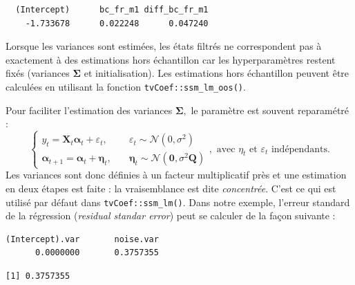 \documentclass[
  a4paper,
  DIV=11,
  numbers=noendperiod,
  french]{scrartcl}
\newenvironment{Shaded}{\begin{snugshade}}{\end{snugshade}}
\newcommand{\FunctionTok}[1]{\textcolor[rgb]{0.28,0.35,0.67}{#1}}
\newcommand{\NormalTok}[1]{\textcolor[rgb]{0.00,0.23,0.31}{#1}}
\newcommand{\SpecialCharTok}[1]{\textcolor[rgb]{0.37,0.37,0.37}{#1}}
\newcommand\1{{\mathds 1}}
\newcommand{\bf}[1]{{\boldsymbol #1}}
\theoremstyle{remark}
\begin{document}
\begin{verbatim}
  (Intercept)      bc_fr_m1 diff_bc_fr_m1 
    -1.733678      0.022248      0.047240 
\end{verbatim}

Lorsque les variances sont estimées, les états filtrés ne correspondent
pas à exactement à des estimations hors échantillon car les
hyperparamètres restent fixés (variances \(\bf\Sigma\) et
initialisation). Les estimations hors échantillon peuvent être calculées
en utilisant la fonction \texttt{tvCoef::ssm\_lm\_oos()}.

Pour faciliter l'estimation des variances \(\bf\Sigma,\) le paramètre
est souvent reparamétré : \[
\begin{cases}
y_t={\bf X_t}\bf\alpha_t+\varepsilon_t,\quad&\varepsilon_t\sim\mathcal N(0,\sigma^2)\\
\bf\alpha_{t+1}=\bf\alpha_t+\bf\eta_t,\quad&\bf\eta_t\sim\mathcal N(\bf 0,\sigma^2\bf Q)
\end{cases},\text{ avec }\eta_t\text{ et }\varepsilon_t\text{ indépendants.}
\] Les variances sont donc définies à un facteur multiplicatif près et
une estimation en deux étapes est faite : la vraisemblance est dite
\emph{concentrée}. C'est ce qui est utilisé par défaut dans
\texttt{tvCoef::ssm\_lm()}. Dans notre exemple, l'erreur standard de la
régression (\emph{residual standar error}) peut se calculer de la façon
suivante :

\begin{Shaded}
\end{Shaded}

\begin{verbatim}
(Intercept).var       noise.var 
      0.0000000       0.3757355 
\end{verbatim}

\begin{Shaded}
\end{Shaded}

\begin{verbatim}
[1] 0.3757355
\end{verbatim}
\end{document}
